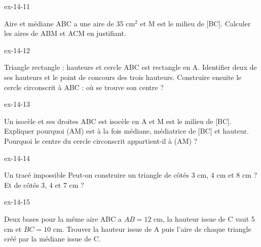 \begin{blocLivre}{ex-14-11}\begin{exercice}[3]{Aire et médiane}
ABC a une aire de 35 cm$^2$ et M est le milieu de [BC]. Calculer les aires de ABM et ACM en justifiant.
\label{fig-ex-14-11}
\end{exercice}\end{blocLivre}
\begin{blocLivre}{ex-14-12}\begin{exercice}[3]{Triangle rectangle : hauteurs et cercle}
ABC est rectangle en A. Identifier deux de ses hauteurs et le point de concours des trois hauteurs. Construire ensuite le cercle circonscrit à ABC : où se trouve son centre ?
\label{fig-ex-14-12}
\end{exercice}\end{blocLivre}
\begin{blocLivre}{ex-14-13}\begin{exercice}[3]{Un isocèle et ses droites}
ABC est isocèle en A et M est le milieu de [BC]. Expliquer pourquoi (AM) est à la fois médiane, médiatrice de [BC] et hauteur. Pourquoi le centre du cercle circonscrit appartient-il à (AM) ?
\label{fig-ex-14-13}
\end{exercice}\end{blocLivre}
\begin{blocLivre}{ex-14-14}\begin{exercice}[3]{Un tracé impossible}
Peut-on construire un triangle de côtés 3 cm, 4 cm et 8 cm ? Et de côtés 3, 4 et 7 cm ?
\label{fig-ex-14-14}
\end{exercice}\end{blocLivre}
\begin{blocLivre}{ex-14-15}\begin{exercice}[3]{Deux bases pour la même aire}
ABC a $AB=12$ cm, la hauteur issue de C vaut 5 cm et $BC=10$ cm. Trouver la hauteur issue de A puis l’aire de chaque triangle créé par la médiane issue de C.
\label{fig-ex-14-15}
\end{exercice}\end{blocLivre}

\clearpage
